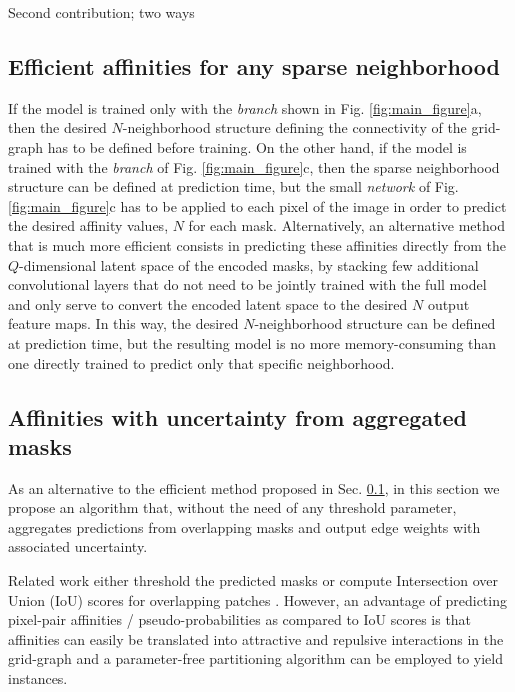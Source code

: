  Second contribution; two ways



\subsection{Efficient affinities for any sparse neighborhood}\label{sec:efficient_affs}
If the model is trained only with the \emph{\sparseBr branch} shown in Fig. \ref{fig:main_figure}a, then the desired $N$-neighborhood structure defining the connectivity of the grid-graph has to be defined before training. 
On the other hand, if the model is trained with the \emph{\encBr branch} of Fig. \ref{fig:main_figure}c, then the sparse neighborhood structure can be defined at prediction time, but the small \emph{\maskDec network} of Fig. \ref{fig:main_figure}c has to be applied to each pixel of the image in order to predict the desired affinity values, $N$ for each mask. 
Alternatively, an alternative method that is much more efficient consists in predicting these affinities directly from the $Q$-dimensional latent space of the encoded masks, by stacking few additional convolutional layers that do not need to be jointly trained with the full model and only serve to convert the encoded latent space to the desired $N$ output feature maps.
In this way, the desired $N$-neighborhood structure can be defined at prediction time, but the resulting model is no more memory-consuming than one directly trained to predict only that specific neighborhood. 



\subsection{Affinities with uncertainty from aggregated masks}\label{sec:aggr_affs}
As an alternative to the efficient method proposed in Sec. \ref{sec:efficient_affs}, in this section we propose an algorithm that, without the need of any threshold parameter, aggregates predictions from overlapping \maskname masks and output edge weights with associated uncertainty.

Related work either threshold the predicted \maskname masks \cite{januszewski2018high,hirsch2020patchperpix,meirovitch2016multi} or compute Intersection over Union (IoU) scores for overlapping patches \cite{liu2016multi}. However, an advantage of predicting pixel-pair affinities / pseudo-probabilities as compared to IoU scores is that affinities can easily be translated into attractive and repulsive interactions in the grid-graph 
and a parameter-free partitioning algorithm can be employed to yield instances.

